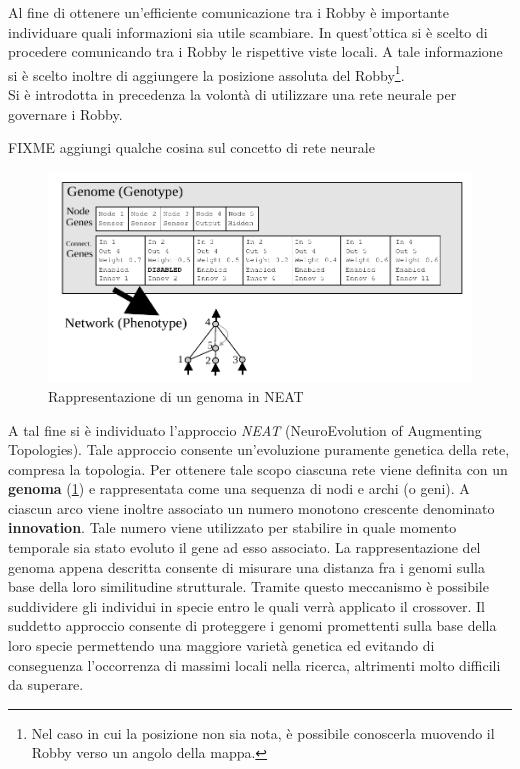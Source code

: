 Al fine di ottenere un'efficiente comunicazione tra i Robby è importante
individuare quali informazioni sia utile scambiare. In quest'ottica si è scelto
di procedere comunicando tra i Robby le rispettive viste locali. A tale
informazione si è scelto inoltre di aggiungere la posizione assoluta del
Robby\footnote{Nel caso in cui la posizione non sia nota, è possibile conoscerla
muovendo il Robby verso un angolo della mappa.}.\\

Si è introdotta in precedenza la volontà di utilizzare una rete neurale per
governare i Robby.

FIXME aggiungi qualche cosina sul concetto di rete neurale
\\



\begin{figure}
	\includegraphics[width=\textwidth]{img/neat-genome.png}
	\caption{Rappresentazione di un genoma in NEAT \cite{stanley2002evolving}}
	\label{fig:neatgenome}
\end{figure}
A tal fine si è individuato l'approccio \emph{NEAT}
(NeuroEvolution of Augmenting Topologies)\cite{stanley2002evolving}. Tale
approccio consente un'evoluzione puramente genetica della rete, compresa la
topologia. Per ottenere tale scopo ciascuna rete viene definita con un
\textbf{genoma} (\cref{fig:neatgenome}) e rappresentata come una sequenza di
nodi e archi (o geni).
A ciascun arco viene inoltre associato un numero monotono crescente denominato
\textbf{innovation}. Tale numero viene utilizzato per stabilire in quale momento
temporale sia stato evoluto il gene ad esso associato. La rappresentazione del
genoma appena descritta consente di misurare una distanza fra i genomi sulla
base della loro similitudine strutturale. Tramite questo meccanismo è possibile
suddividere gli individui in specie entro le quali verrà applicato il crossover.
Il suddetto approccio consente di proteggere i genomi promettenti sulla base
della loro specie permettendo una maggiore varietà genetica ed evitando di
conseguenza l'occorrenza di massimi locali nella ricerca, altrimenti molto
difficili da superare.\\

